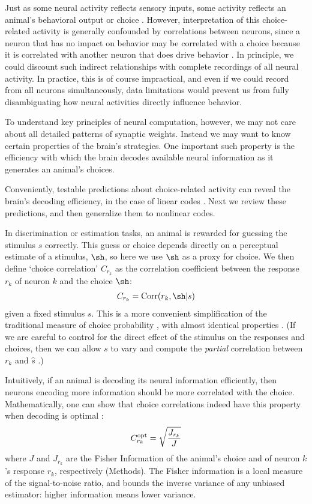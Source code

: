 \documentclass[11pt,twocolumn]{article}
\begin{document}
Just as some neural activity reflects sensory inputs, some activity reflects an animal's behavioral output or choice \cite{Britten}. However, interpretation of this choice-related activity is generally confounded by correlations between neurons, since a neuron that has no impact on behavior may be correlated with a choice because it is correlated with another neuron that does drive behavior \cite{haefner}. In principle, we could discount such indirect relationships with complete recordings of all neural activity. In practice, this is of course impractical, and even if we could record from all neurons simultaneously, data limitations would prevent us from fully disambiguating how neural activities directly influence behavior.

To understand key principles of neural computation, however, we may not care about all detailed patterns of synaptic weights. Instead we may want to know certain properties of the brain's strategies. One important such property is the efficiency with which the brain decodes available neural information as it generates an animal's choices.

Conveniently, testable predictions about choice-related activity can reveal the brain's decoding efficiency, in the case of linear codes \cite{pitkow}. Next we review these predictions, and then generalize them to nonlinear codes.

In discrimination or estimation tasks, an animal is rewarded for guessing the stimulus $s$ correctly. This guess or choice depends directly on a perceptual estimate of a stimulus, $\sh$, so here we use $\sh$ as a proxy for choice. We then define `choice correlation' $C_{r_k}$ as the correlation coefficient between the response $r_k$ of neuron $k$ and the choice $\sh$:
\begin{align}
C_{r_k}={\rm Corr}(r_k,\sh|s)
\end{align}
given a fixed stimulus $s$. This is a more convenient simplification of the traditional measure of choice probability \cite{Britten}, with almost identical properties \cite{pitkow}. (If we are careful to control for the direct effect of the stimulus on the responses and choices, then we can allow $s$ to vary and compute the {\it partial} correlation between $r_k$ and $\hat{s}$ \cite{Maunsell}.)

Intuitively, if an animal is decoding its neural information efficiently, then neurons encoding more information should be more correlated with the choice. Mathematically, one can show that choice correlations indeed have this property when decoding is optimal \cite{pitkow}:
\begin{align}
	C_{r_k}^{\rm opt}=\sqrt{\frac{J_{r_k}}{J}}
	\label{eq:CCoptlin}
\end{align}
where $J$ and $J_{r_k}$ are the Fisher Information of the animal's choice and of neuron $k$'s response $r_k$, respectively (Methods). The Fisher information is a local measure of the signal-to-noise ratio, and bounds the inverse variance of any unbiased estimator: higher information means lower variance.
\end{document}
